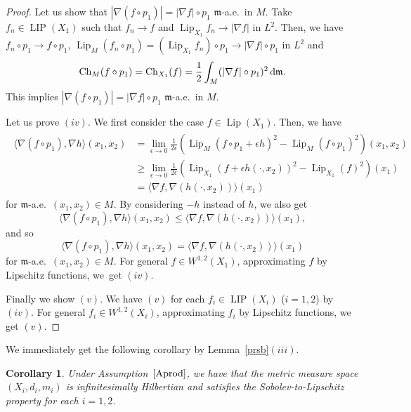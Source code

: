 \documentclass[10pt,a4paper]{amsart}
\numberwithin{equation}{section}
\newtheorem{Cor}[Thm]{Corollary}
\theoremstyle{definition}
\newcommand{\LIP}{\operatorname{LIP}}
\newcommand{\Lip}{\operatorname{Lip}}
\newcommand{\Ch}{\operatorname{Ch}}
\newcommand{\mf}{\mathfrak{m}}
\begin{document}
\begin{proof}
Let us show that $|\nabla (f\circ p_1)|=|\nabla f|\circ p_1$ $\mf$-a.e.\ in $M$.
Take $f_n\in \LIP(X_1)$ such that $f_n\to f$ and $\Lip_{X_1} f_n\to |\nabla f|$ in $L^2$.
Then, we have $f_n\circ p_1\to f\circ p_1$, $\Lip_M (f_n\circ p_1)=(\Lip_{X_1} f_n)\circ p_1 \to |\nabla f|\circ p_1$ in $L^2$ and
\[
\Ch_{M}(f\circ p_1)=\Ch_{X_1}(f)=\frac{1}{2}\int_{M}(|\nabla f|\circ p_1)^2\,{\rm d}\mf.
\]
This implies $|\nabla (f\circ p_1)|=|\nabla f|\circ p_1$ $\mf$-a.e.\ in $M$.

Let us prove $(iv)$.
We first consider the case $f\in \Lip(X_1)$.
Then, we have
\begin{gather*}
\begin{split}
\langle\nabla(f\circ p_1),\nabla h\rangle(x_1,x_2)
&=\lim_{\epsilon\to 0}\frac{1}{2\epsilon}\left(\Lip_M(f\circ p_1+\epsilon h)^2-\Lip_M(f\circ p_1)^2\right)(x_1,x_2)\\
&\geq \lim_{\epsilon\to 0}\frac{1}{2\epsilon}\left(\Lip_{X_1}(f+\epsilon h(\cdot,x_2))^2-\Lip_{X_1}(f)^2\right)(x_1)\\
&=\langle\nabla f,\nabla (h(\cdot,x_2))\rangle(x_1)
\end{split}
\end{gather*}
for $\mf$-a.e.\ $(x_1,x_2)\in M$.
By considering $-h$ instead of $h$, we also get \[\langle\nabla(f\circ p_1),\nabla h\rangle(x_1,x_2)\leq \langle\nabla f,\nabla (h(\cdot,x_2))\rangle(x_1),\] and so \[\langle\nabla(f\circ p_1),\nabla h\rangle(x_1,x_2)= \langle\nabla f,\nabla (h(\cdot,x_2))\rangle(x_1)\]
for $\mf$-a.e.\ $(x_1,x_2)\in M$.
For general $f\in W^{1,2}(X_1)$, approximating $f$ by Lipschitz functions, we~get $(iv)$.

Finally we show $(v)$.
We have $(v)$ for each $f_i\in\LIP(X_i)$ ($i=1,2$) by $(iv)$.
For general $f_i\in W^{1,2}(X_i)$, approximating $f_i$ by Lipschitz functions, we get $(v)$.
\end{proof}

We immediately get the following corollary by Lemma~\ref{prsb}$(iii)$.
\begin{Cor}\label{ihsl}
Under Assumption~$\ref{Aprod}$, we have that the metric measure space $(X_i,d_i,m_i)$ is infinitesimally Hilbertian and satisfies the Sobolev-to-Lipschitz property for each $i=1,2$.
\end{Cor}
\end{document}
